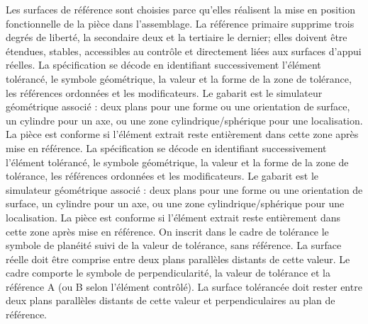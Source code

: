 \begin{corrigebox}
Les surfaces de référence sont choisies parce qu'elles
                réalisent la mise en position fonctionnelle de la pièce dans l'assemblage.
                La référence primaire supprime trois degrés de liberté, la secondaire deux
                et la tertiaire le dernier; elles doivent être étendues, stables,
                accessibles au contrôle et directement liées aux surfaces d'appui réelles.
La spécification se décode en identifiant successivement
                l'élément tolérancé, le symbole géométrique, la valeur et la forme de la
                zone de tolérance, les références ordonnées et les modificateurs. Le
                gabarit est le simulateur géométrique associé : deux plans pour une forme
                ou une orientation de surface, un cylindre pour un axe, ou une zone
                cylindrique/sphérique pour une localisation. La pièce est conforme si
                l'élément extrait reste entièrement dans cette zone après mise en référence.
La spécification se décode en identifiant successivement
                l'élément tolérancé, le symbole géométrique, la valeur et la forme de la
                zone de tolérance, les références ordonnées et les modificateurs. Le
                gabarit est le simulateur géométrique associé : deux plans pour une forme
                ou une orientation de surface, un cylindre pour un axe, ou une zone
                cylindrique/sphérique pour une localisation. La pièce est conforme si
                l'élément extrait reste entièrement dans cette zone après mise en référence.
On inscrit dans le cadre de tolérance le symbole de
                planéité suivi de la valeur de tolérance, sans référence. La surface réelle doit être
                comprise entre deux plans parallèles distants de cette valeur.
Le cadre comporte le symbole de perpendicularité,
                la valeur de tolérance et la référence A (ou B selon l'élément contrôlé). La surface
                tolérancée doit rester entre deux plans parallèles distants de cette valeur et
                perpendiculaires au plan de référence.
\end{corrigebox}
